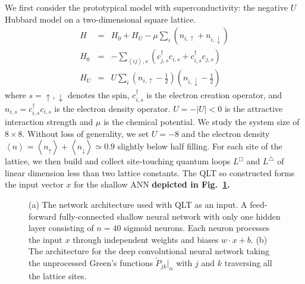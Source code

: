 \documentclass[amsmath,amssymb, aps, prx, longbibliography, twocolumn]{revtex4-1}
\begin{document}
We first consider the prototypical model with superconductivity: the negative $U$ Hubbard model on a two-dimensional square lattice\cite{Scalettar1989, Scalapino1992}. 
\begin{eqnarray}
H &=& H_0 + H_U -  \mu\underset{i}{\sum} \left(n_{i,\uparrow} +n_{i,\downarrow}\right) \nonumber\\
H_0 &=& -\underset{\left\langle ij \right\rangle, s}{\sum} \left( c^\dagger_{j,s}c_{i,s} +  c^\dagger_{i,s}c_{j,s} \right) \nonumber \\
H_U &=& U \underset{i}{\sum} \left(n_{i,\uparrow}-\frac{1}{2}\right) \left(n_{i,\downarrow}-\frac{1}{2}\right)
\label{eq:hubbard}
\end{eqnarray}
where $s = \uparrow, \downarrow$ denotes the spin, $c^\dagger_{i,s}$ is the electron creation operator, and $n_{i,s}=c^\dagger_{i,s}c_{i,s}$ is the electron density operator. $U=-\left|U\right|<0$ is the attractive interaction strength and $\mu$ is the chemical potential. We study the system size of $8\times 8$. Without loss of generality, we set $U=-8$ and the electron density $\left\langle n\right\rangle = \left\langle n_\uparrow\right\rangle+ \left\langle n_\downarrow\right\rangle  \simeq 0.9$ slightly below half filling.  For each site of the lattice, we then build and collect site-touching quantum loops $L^\Box$ and $ L^\triangle$ of linear dimension less than two lattice constants. The QLT so constructed forms the input vector $x$ for the shallow ANN {\color{red} \bf depicted in Fig.~\ref{fig:network_architecture}.}  



\begin{figure}
    \centering
    \caption{(a) The network architecture used with QLT as an input. A feed-forward fully-connected shallow neural network with only one hidden layer consisting of $n=40$ sigmoid neurons. Each neuron processes the input $x$ through independent weights and biases $w\cdot x+b$. 
    (b) The architecture for the deep convolutional neural network taking the unprocessed Green's functions $\widetilde{P}_{jk}|_{\alpha}$ with $j$ and $k$ traversing all the lattice sites.}
    \label{fig:network_architecture}
\end{figure}
\end{document}
